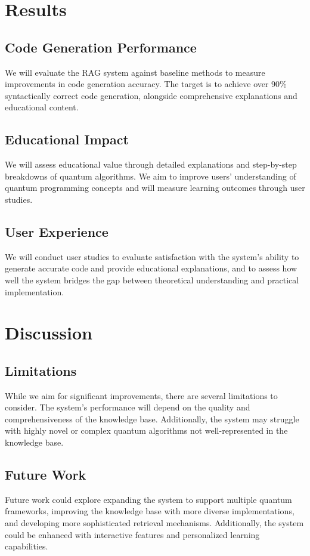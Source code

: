\documentclass[runningheads]{llncs}
\begin{document}
\section{Results}

\subsection{Code Generation Performance}
We will evaluate the RAG system against baseline methods to measure improvements in code generation accuracy. The target is to achieve over 90\% syntactically correct code generation, alongside comprehensive explanations and educational content.

\subsection{Educational Impact}
We will assess educational value through detailed explanations and step-by-step breakdowns of quantum algorithms. We aim to improve users' understanding of quantum programming concepts and will measure learning outcomes through user studies.

\subsection{User Experience}
We will conduct user studies to evaluate satisfaction with the system's ability to generate accurate code and provide educational explanations, and to assess how well the system bridges the gap between theoretical understanding and practical implementation.

\section{Discussion}

\subsection{Limitations}
While we aim for significant improvements, there are several limitations to consider. The system's performance will depend on the quality and comprehensiveness of the knowledge base. Additionally, the system may struggle with highly novel or complex quantum algorithms not well-represented in the knowledge base.

\subsection{Future Work}
Future work could explore expanding the system to support multiple quantum frameworks, improving the knowledge base with more diverse implementations, and developing more sophisticated retrieval mechanisms. Additionally, the system could be enhanced with interactive features and personalized learning capabilities.
\end{document}
